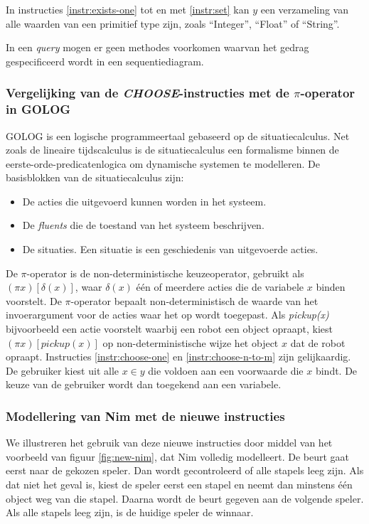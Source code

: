 In instructies \ref{instr:exists-one} tot en met \ref{instr:set} kan $y$ een verzameling van alle waarden van een primitief type zijn, zoals ``Integer'', ``Float'' of ``String''.

In een \textit{query} mogen er geen methodes voorkomen waarvan het gedrag gespecificeerd wordt in een sequentiediagram.

\subsubsection{Vergelijking van de \textit{CHOOSE}-instructies met de $\pi$-operator in GOLOG}

GOLOG\cite{levesque1997golog} is een logische programmeertaal gebaseerd op de situatiecalculus. Net zoals de lineaire tijdscalculus is de situatiecalculus een formalisme binnen de eerste-orde-predicatenlogica om dynamische systemen te modelleren. De basisblokken van de situatiecalculus zijn:

\begin{itemize}
	\item De acties die uitgevoerd kunnen worden in het systeem.
	\item De \textit{fluents} die de toestand van het systeem beschrijven.
	\item De situaties. Een situatie is een geschiedenis van uitgevoerde acties.
\end{itemize}

De $\pi$-operator is de non-deterministische keuzeoperator, gebruikt als $(\pi{}x)[\delta{}(x)]$, waar $\delta{}(x)$ \'e\'en of meerdere acties die de variabele $x$ binden voorstelt. De $\pi$-operator bepaalt non-deterministisch de waarde van het invoerargument voor de acties waar het op wordt toegepast. Als \textit{pickup(x)} bijvoorbeeld een actie voorstelt waarbij een robot een object opraapt, kiest $(\pi{}x)[pickup(x)]$ op non-deterministische wijze het object $x$ dat de robot opraapt. Instructies \ref{instr:choose-one} en \ref{instr:choose-n-to-m} zijn gelijkaardig. De gebruiker kiest uit alle $x \in y$ die voldoen aan een voorwaarde die $x$ bindt. De keuze van de gebruiker wordt dan toegekend aan een variabele. 

\subsubsection{Modellering van Nim met de nieuwe instructies}

We illustreren het gebruik van deze nieuwe instructies door middel van het voorbeeld van figuur \ref{fig:new-nim}, dat Nim volledig modelleert. De beurt gaat eerst naar de gekozen speler. Dan wordt gecontroleerd of alle stapels leeg zijn. Als dat niet het geval is, kiest de speler eerst een stapel en neemt dan minstens \'e\'en object weg van die stapel. Daarna wordt de beurt gegeven aan de volgende speler. Als alle stapels leeg zijn, is de huidige speler de winnaar.

